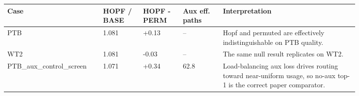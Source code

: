 \begin{tabular}{p{0.20\linewidth}p{0.10\linewidth}p{0.10\linewidth}p{0.10\linewidth}p{0.34\linewidth}}
\toprule
Case & HOPF / BASE & HOPF - PERM & Aux eff. paths & Interpretation \\
\midrule
PTB & 1.081 & +0.13 & -- & Hopf and permuted are effectively indistinguishable on PTB quality. \\
WT2 & 1.081 & -0.03 & -- & The same null result replicates on WT2. \\
PTB\_aux\_control\_screen & 1.071 & +0.34 & 62.8 & Load-balancing aux loss drives routing toward near-uniform usage, so no-aux top-1 is the correct paper comparator. \\
\bottomrule
\end{tabular}
